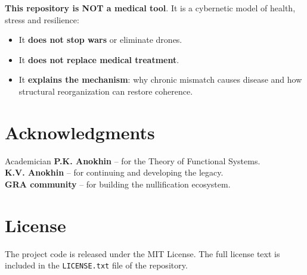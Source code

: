\documentclass[11pt,a4paper]{article}
\begin{document}
\textbf{This repository is NOT a medical tool}. It is a cybernetic model of health, stress and resilience:
\begin{itemize}
  \item It \textbf{does not stop wars} or eliminate drones.
  \item It \textbf{does not replace medical treatment}.
  \item It \textbf{explains the mechanism}: why chronic mismatch causes disease and how structural reorganization can restore coherence.
\end{itemize}

\section*{Acknowledgments}

Academician \textbf{P.K. Anokhin} -- for the Theory of Functional Systems. \\
\textbf{K.V. Anokhin} -- for continuing and developing the legacy. \\
\textbf{GRA community} -- for building the nullification ecosystem.

\section*{License}

The project code is released under the MIT License. The full license text is included in the \texttt{LICENSE.txt} file of the repository.
\end{document}
